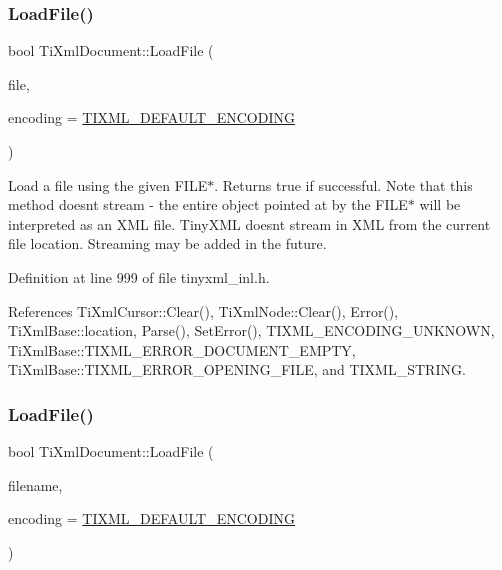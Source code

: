 \subsubsection{\texorpdfstring{Load\+File()}{LoadFile()}\hspace{0.1cm}{\footnotesize\ttfamily [3/4]}}
{\footnotesize\ttfamily bool Ti\+Xml\+Document\+::\+Load\+File (\begin{DoxyParamCaption}\item[{F\+I\+LE $\ast$}]{file,  }\item[{\hyperlink{tinyxml_8h_a88d51847a13ee0f4b4d320d03d2c4d96}{Ti\+Xml\+Encoding}}]{encoding = {\ttfamily \hyperlink{tinyxml_8h_ad5b8b092878e9010d6400cb6c13d4879}{T\+I\+X\+M\+L\+\_\+\+D\+E\+F\+A\+U\+L\+T\+\_\+\+E\+N\+C\+O\+D\+I\+NG}} }\end{DoxyParamCaption})}

Load a file using the given F\+I\+L\+E$\ast$. Returns true if successful. Note that this method doesn\textquotesingle{}t stream -\/ the entire object pointed at by the F\+I\+L\+E$\ast$ will be interpreted as an X\+ML file. Tiny\+X\+ML doesn\textquotesingle{}t stream in X\+ML from the current file location. Streaming may be added in the future. 

Definition at line 999 of file tinyxml\+\_\+inl.\+h.



References Ti\+Xml\+Cursor\+::\+Clear(), Ti\+Xml\+Node\+::\+Clear(), Error(), Ti\+Xml\+Base\+::location, Parse(), Set\+Error(), T\+I\+X\+M\+L\+\_\+\+E\+N\+C\+O\+D\+I\+N\+G\+\_\+\+U\+N\+K\+N\+O\+WN, Ti\+Xml\+Base\+::\+T\+I\+X\+M\+L\+\_\+\+E\+R\+R\+O\+R\+\_\+\+D\+O\+C\+U\+M\+E\+N\+T\+\_\+\+E\+M\+P\+TY, Ti\+Xml\+Base\+::\+T\+I\+X\+M\+L\+\_\+\+E\+R\+R\+O\+R\+\_\+\+O\+P\+E\+N\+I\+N\+G\+\_\+\+F\+I\+LE, and T\+I\+X\+M\+L\+\_\+\+S\+T\+R\+I\+NG.

\hypertarget{class_ti_xml_document_a18ae6ed34fed7991ebc220862dfac884}{}\label{class_ti_xml_document_a18ae6ed34fed7991ebc220862dfac884} 
\subsubsection{\texorpdfstring{Load\+File()}{LoadFile()}\hspace{0.1cm}{\footnotesize\ttfamily [4/4]}}
{\footnotesize\ttfamily bool Ti\+Xml\+Document\+::\+Load\+File (\begin{DoxyParamCaption}\item[{const std\+::string \&}]{filename,  }\item[{\hyperlink{tinyxml_8h_a88d51847a13ee0f4b4d320d03d2c4d96}{Ti\+Xml\+Encoding}}]{encoding = {\ttfamily \hyperlink{tinyxml_8h_ad5b8b092878e9010d6400cb6c13d4879}{T\+I\+X\+M\+L\+\_\+\+D\+E\+F\+A\+U\+L\+T\+\_\+\+E\+N\+C\+O\+D\+I\+NG}} }\end{DoxyParamCaption})\hspace{0.3cm}{\ttfamily [inline]}}


